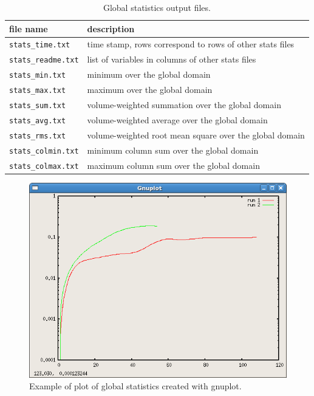 \begin{table}[ht] 
\caption{Global statistics output files.}
\vspace{0.5cm} \centering 
\begin{tabular}{ll} 
\hline\hline file name & description  \\
\hline 
\verb|stats_time.txt| & time stamp, rows correspond to rows of other stats files \\
\verb|stats_readme.txt| & list of variables in columns of other stats files \\
\verb|stats_min.txt| & minimum over the global domain \\
\verb|stats_max.txt| & maximum over the global domain \\
\verb|stats_sum.txt| & volume-weighted summation over the global domain \\
\verb|stats_avg.txt| & volume-weighted average over the global domain \\
\verb|stats_rms.txt| & volume-weighted root mean square over the global domain \\
\verb|stats_colmin.txt| & minimum column sum over the global domain \\
\verb|stats_colmax.txt| & maximum column sum over the global domain \\
\hline 
\end{tabular} \label{oceanTable:global statistics} 
\end{table}

\begin{figure}[H!]
	\centering
	\includegraphics[scale=0.5]{ocean/figures/gnuplot.png}
	\caption{Example of plot of global statistics created with gnuplot.}
	\label{fig:gnuplot}
\end{figure}
